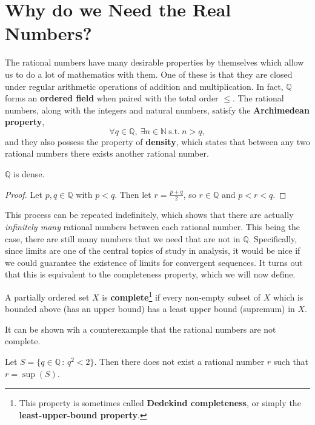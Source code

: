 \documentclass[../real_analysis.tex]{subfiles}
\begin{document}
    \section{Why do we Need the Real Numbers?}\label{sec:why-do-we-need-real-numbers}
        The rational numbers have many desirable properties by themselves which allow us to do a lot of mathematics with them. One of these is that they are closed under regular arithmetic operations of addition and multiplication. In fact, $\mathbb{Q}$ forms an \textbf{ordered field} when paired with the total order $\leq$. The rational numbers, along with the integers and natural numbers, satisfy the \textbf{Archimedean property},
        \[\forall q\in\mathbb{Q},\ \exists n\in\mathbb{N}\ \mathrm{s.t.}\ n>q,\]
        and they also possess the property of \textbf{density}, which states that between any two rational numbers there exists another rational number.
        \begin{theorem}
            $\mathbb{Q}$ is dense.
        \end{theorem}
        \begin{proof}
            Let $p,q\in\mathbb{Q}$ with $p<q$. Then let $r=\frac{p+q}{2}$, so $r\in\mathbb{Q}$ and $p<r<q$.
        \end{proof}
        This process can be repeated indefinitely, which shows that there are actually \textit{infinitely many} rational numbers between each rational number. This being the case, there are still many numbers that we need that are not in $\mathbb{Q}$. Specifically, since limits are one of the central topics of study in analysis, it would be nice if we could guarantee the existence of limits for convergent sequences. It turns out that this is equivalent to the completeness property, which we will now define.
        \begin{definition}
            A partially ordered set $X$ is \textbf{complete}\footnote{This property is sometimes called \textbf{Dedekind completeness}, or simply the \textbf{least-upper-bound property}.} if every non-empty subset of $X$ which is bounded above (has an upper bound) has a least upper bound (supremum) in $X$.
        \end{definition}
        It can be shown wih a counterexample that the rational numbers are not complete.
        \begin{theorem}
            Let $S=\{q\in\mathbb{Q}\,:\,q^2<2\}$. Then there does not exist a rational number $r$ such that $r=\sup(S)$.
        \end{theorem}
\end{document}
